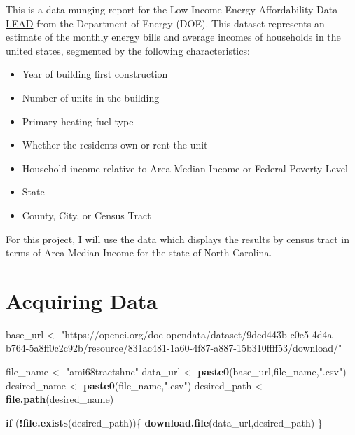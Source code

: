 \documentclass[]{article}
\newenvironment{Shaded}{\begin{snugshade}}{\end{snugshade}}
\newcommand{\ControlFlowTok}[1]{\textcolor[rgb]{0.13,0.29,0.53}{\textbf{#1}}}
\newcommand{\KeywordTok}[1]{\textcolor[rgb]{0.13,0.29,0.53}{\textbf{#1}}}
\newcommand{\NormalTok}[1]{#1}
\newcommand{\OperatorTok}[1]{\textcolor[rgb]{0.81,0.36,0.00}{\textbf{#1}}}
\newcommand{\StringTok}[1]{\textcolor[rgb]{0.31,0.60,0.02}{#1}}
\providecommand{\tightlist}{%
  \setlength{\itemsep}{0pt}\setlength{\parskip}{0pt}}
\begin{document}
This is a data munging report for the Low Income Energy Affordability
Data
\href{https://catalog.data.gov/dataset/low-income-energy-affordability-data-lead-tool}{LEAD}
from the Department of Energy (DOE). This dataset represents an estimate
of the monthly energy bills and average incomes of households in the
united states, segmented by the following characteristics:

\begin{itemize}
\tightlist
\item
  Year of building first construction
\item
  Number of units in the building
\item
  Primary heating fuel type
\item
  Whether the residents own or rent the unit
\item
  Household income relative to Area Median Income or Federal Poverty
  Level
\item
  State
\item
  County, City, or Census Tract
\end{itemize}

For this project, I will use the data which displays the results by
census tract in terms of Area Median Income for the state of North
Carolina.

\hypertarget{acquiring-data}{%
\section{Acquiring Data}\label{acquiring-data}}

\begin{Shaded}
\begin{Highlighting}[]
\NormalTok{base_url <-}\StringTok{ "https://openei.org/doe-opendata/dataset/9dcd443b-c0e5-4d4a-b764-5a8ff0c2c92b/resource/831ac481-1a60-4f87-a887-15b310ffff53/download/"}


\NormalTok{file_name <-}\StringTok{ "ami68tractshnc"}
\NormalTok{data_url <-}\StringTok{ }\KeywordTok{paste0}\NormalTok{(base_url,file_name,}\StringTok{".csv"}\NormalTok{)}
\NormalTok{desired_name <-}\StringTok{ }\KeywordTok{paste0}\NormalTok{(file_name,}\StringTok{".csv"}\NormalTok{)}
\NormalTok{desired_path <-}\StringTok{ }\KeywordTok{file.path}\NormalTok{(desired_name)}

\ControlFlowTok{if}\NormalTok{ (}\OperatorTok{!}\KeywordTok{file.exists}\NormalTok{(desired_path))\{}
  \KeywordTok{download.file}\NormalTok{(data_url,desired_path)}
\NormalTok{\}}
\end{Highlighting}
\end{Shaded}
\end{document}

